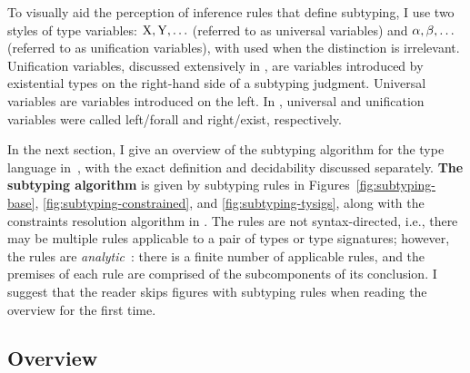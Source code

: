 

To visually aid the perception of inference rules that define subtyping,
I use two styles of type variables: $\mathrm{X}, \mathrm{Y}, \ldots$ (referred to as
universal variables) and $\alpha, \beta, \ldots$ (referred to as unification
variables), with \vany used when the distinction is irrelevant.
{Unification} variables, discussed extensively
in , are variables introduced by existential
types on the right-hand side of a subtyping judgment.
Universal variables are variables introduced on the left.
In , universal and unification variables
were called left/forall and right/exist, respectively.

In the next section, I give an overview of the subtyping
algorithm for the type language in~,
with the exact definition and decidability discussed separately.
\textbf{The subtyping algorithm} is given by subtyping rules in
Figures~\ref{fig:subtyping-base}, \ref{fig:subtyping-constrained}, and
\ref{fig:subtyping-tysigs},
along with the constraints resolution algorithm in .
The rules are not syntax-directed, i.e., there may be multiple rules
applicable to a pair of types or type signatures; however, the rules
are \emph{analytic}~\cite{bib:martin-lof:analytic-synthetic:1994}:
there is a finite number of applicable rules, and the premises of each rule
are comprised of the subcomponents of its conclusion.
I suggest that the reader skips figures with subtyping rules
when reading the overview for the first time.


\subsection{Overview}

